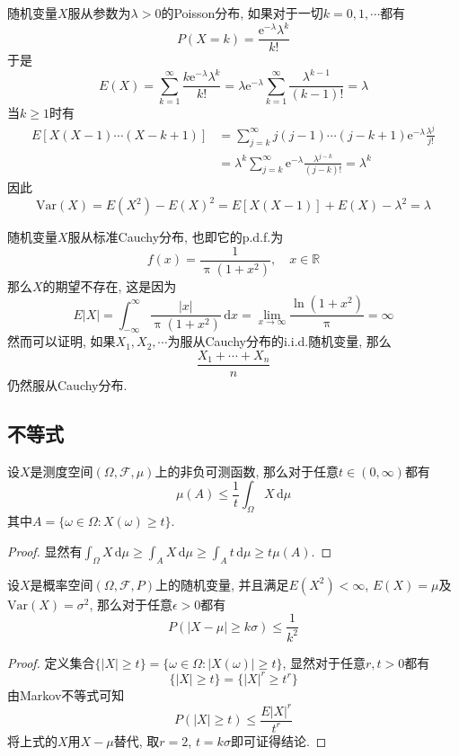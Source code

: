 \documentclass[cn, 12pt, math=mtpro2, bibstyle=apa, blue, twocol]{elegantbook}
\newcommand{\F}{\mathcal{F}}
\newcommand{\R}{\mathbb{R}}
\begin{document}
\begin{example}
随机变量$X$服从参数为$\lambda>0$的Poisson分布, 如果对于一切$k=0,1,\cdots$都有
$$P(X=k)=\frac{\text{e}^{-\lambda}\lambda^k}{k!}$$
于是
$$E(X)=\sum_{k=1}^{\infty}\frac{k\text{e}^{-\lambda}\lambda^k}{k!}=\lambda\text{e}^{-\lambda}\sum_{k=1}^{\infty}\frac{\lambda^{k-1}}{(k-1)!}=\lambda$$
当$k\geq1$时有
\begin{align*}
E[X(X-1)\cdots(X-k+1)]&=\sum_{j=k}^{\infty}j(j-1)\cdots(j-k+1)\text{e}^{-\lambda}\frac{\lambda^j}{j!} \\
&=\lambda^k\sum_{j=k}^{\infty}\text{e}^{-\lambda}\frac{\lambda^{j-k}}{(j-k)!}=\lambda^k
\end{align*}
因此
$$\text{Var}(X)=E(X^2)-E(X)^2=E[X(X-1)]+E(X)-\lambda^2=\lambda$$

\end{example}
\begin{example}
随机变量$X$服从标准Cauchy分布, 也即它的p.d.f.为
$$f(x)=\frac{1}{\uppi(1+x^2)},\quad x\in\R$$
那么$X$的期望不存在, 这是因为
$$E|X|=\int_{-\infty}^{\infty}\frac{|x|}{\uppi(1+x^2)}\,\text{d}x=\lim_{x\to\infty}\frac{\ln (1+x^2)}{\uppi}=\infty$$
然而可以证明, 如果$X_1,X_2,\cdots$为服从Cauchy分布的i.i.d.随机变量, 那么
$$\frac{X_1+\cdots+X_n}{n}$$
仍然服从Cauchy分布.
\end{example}
\subsection{不等式}
\begin{theorem}[Markov不等式]
设$X$是测度空间$(\Omega,\F,\mu)$上的非负可测函数, 那么对于任意$t\in (0,\infty)$都有
\begin{equation}\label{eq1.15}
  \mu(A)\leq\frac{1}{t}\int_\Omega X\,\text{d}\mu
\end{equation}
其中$A=\{\omega\in\Omega: X(\omega)\geq t\}$.
\end{theorem}
\begin{proof}
  显然有$\int_\Omega X\,\text{d}\mu\geq\int_AX\,\text{d}\mu\geq\int_At\,\text{d}\mu\geq t\mu(A)$.
\end{proof}
\begin{corollary}[Chebyshev不等式]
设$X$是概率空间$(\Omega,\F,P)$上的随机变量, 并且满足$E(X^2)<\infty$, $E(X)=\mu$及$\text{Var}(X)=\sigma^2$, 那么对于任意$\epsilon>0$都有
$$P(|X-\mu|\geq k\sigma)\leq\frac{1}{k^2}$$
\end{corollary}
\begin{proof}
  定义集合$\{|X|\geq t\}=\{\omega\in\Omega: |X(\omega)|\geq t\}$, 显然对于任意$r, t>0$都有
  $$\{|X|\geq t\}=\{|X|^r\geq t^r\}$$
  由Markov不等式可知
  \begin{equation}\label{eq1.30}
    P(|X|\geq t)\leq \frac{E|X|^r}{t^r}
  \end{equation}
  将上式的$X$用$X-\mu$替代, 取$r=2$, $t=k\sigma$即可证得结论.
\end{proof}
\end{document}
